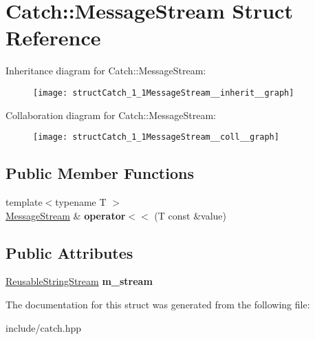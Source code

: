 \hypertarget{structCatch_1_1MessageStream}{}\section{Catch\+:\+:Message\+Stream Struct Reference}
\label{structCatch_1_1MessageStream}


Inheritance diagram for Catch\+:\+:Message\+Stream\+:\nopagebreak
\begin{figure}[H]
\begin{center}
\leavevmode
\texttt{[image: structCatch\_1\_1MessageStream\_\_inherit\_\_graph]}
\end{center}
\end{figure}


Collaboration diagram for Catch\+:\+:Message\+Stream\+:\nopagebreak
\begin{figure}[H]
\begin{center}
\leavevmode
\texttt{[image: structCatch\_1\_1MessageStream\_\_coll\_\_graph]}
\end{center}
\end{figure}
\subsection*{Public Member Functions}
\begin{DoxyCompactItemize}
\item 
{\footnotesize template$<$typename T $>$ }\\\hyperlink{structCatch_1_1MessageStream}{Message\+Stream} \& {\bfseries operator$<$$<$} (T const \&value)\hypertarget{structCatch_1_1MessageStream_a554c4aff5925a077e9fe9d858217428d}{}\label{structCatch_1_1MessageStream_a554c4aff5925a077e9fe9d858217428d}

\end{DoxyCompactItemize}
\subsection*{Public Attributes}
\begin{DoxyCompactItemize}
\item 
\hyperlink{classCatch_1_1ReusableStringStream}{Reusable\+String\+Stream} {\bfseries m\+\_\+stream}\hypertarget{structCatch_1_1MessageStream_a9202520faed8882ef469db9f353ec578}{}\label{structCatch_1_1MessageStream_a9202520faed8882ef469db9f353ec578}

\end{DoxyCompactItemize}


The documentation for this struct was generated from the following file\+:\begin{DoxyCompactItemize}
\item 
include/catch.\+hpp\end{DoxyCompactItemize}
